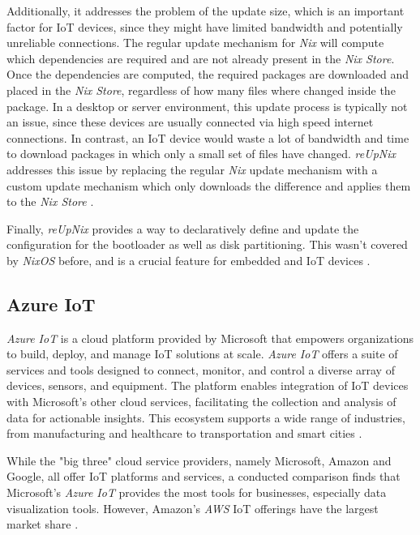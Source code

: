 Additionally, it addresses the problem of the update size, which is an important
factor for \ac{IoT} devices, since they might have limited bandwidth and
potentially unreliable connections. The regular update mechanism for \textit{Nix}
will compute which dependencies are required and are not already present in the \textit{Nix Store}.
Once the dependencies are computed, the required packages are downloaded and
placed in the \textit{Nix Store}, regardless of how many files where changed inside
the package. In a desktop or server environment, this
update process is typically not an issue, since these devices are usually
connected via high speed internet connections. In contrast, an \ac{IoT} device
would waste a lot of bandwidth and time to download packages in which only a
small set of files have changed. \textit{reUpNix} addresses this issue by
replacing the regular \textit{Nix} update mechanism with a custom update mechanism
which only downloads the difference and applies them to the \textit{Nix Store}
\cite{gollenstede:23:lctes}.

Finally, \textit{reUpNix} provides a way to declaratively define and update
the configuration for the bootloader as well as disk partitioning. This wasn't
covered by \textit{NixOS} before, and is a crucial feature for embedded and
\ac{IoT} devices \cite{gollenstede:23:lctes}.

\subsection{Azure IoT}
\textit{Azure IoT} is a cloud platform provided by Microsoft that
empowers organizations to build, deploy, and manage \ac{IoT} solutions at scale.
\textit{Azure IoT} offers a suite of services and tools designed to connect,
monitor, and control a diverse array of devices, sensors, and equipment. The
platform enables integration of \ac{IoT} devices with Microsoft's other cloud
services, facilitating the collection and analysis of data for actionable insights.
This ecosystem supports a wide range of industries, from manufacturing and
healthcare to transportation and smart cities \cite{msdoc-aziot}.

While the "big three" cloud service providers, namely Microsoft, Amazon and
Google, all offer \ac{IoT} platforms and services, a conducted comparison finds
that Microsoft's \textit{Azure IoT} provides the most tools for businesses,
especially data visualization tools. However, Amazon's \textit{AWS} \ac{IoT}
offerings have the largest market share \cite{9116254}.

